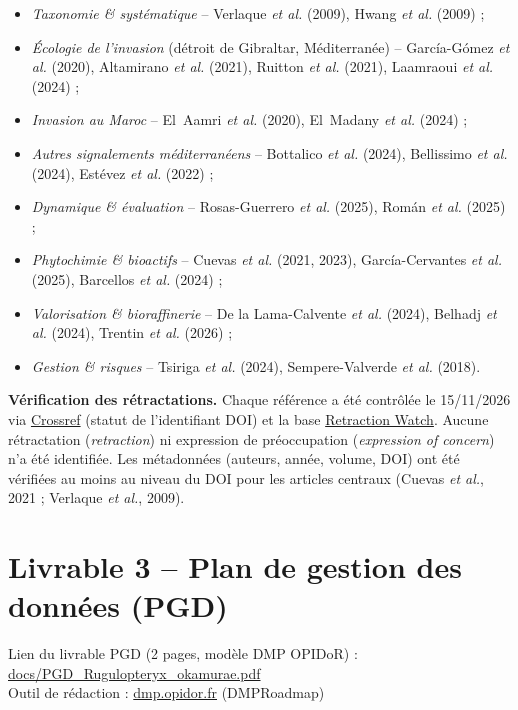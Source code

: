 \documentclass[11pt,a4paper]{article}
\begin{document}
\begin{itemize}
  \item \textit{Taxonomie \& systématique} -- Verlaque \textit{et al.} (2009), Hwang \textit{et al.} (2009) ;
  \item \textit{Écologie de l'invasion} (détroit de Gibraltar, Méditerranée) -- García-Gómez \textit{et al.} (2020), Altamirano \textit{et al.} (2021), Ruitton \textit{et al.} (2021), Laamraoui \textit{et al.} (2024) ;
  \item \textit{Invasion au Maroc} -- El~Aamri \textit{et al.} (2020), El~Madany \textit{et al.} (2024) ;
  \item \textit{Autres signalements méditerranéens} -- Bottalico \textit{et al.} (2024), Bellissimo \textit{et al.} (2024), Estévez \textit{et al.} (2022) ;
  \item \textit{Dynamique \& évaluation} -- Rosas-Guerrero \textit{et al.} (2025), Román \textit{et al.} (2025) ;
  \item \textit{Phytochimie \& bioactifs} -- Cuevas \textit{et al.} (2021, 2023), García-Cervantes \textit{et al.} (2025), Barcellos \textit{et al.} (2024) ;
  \item \textit{Valorisation \& bioraffinerie} -- De la Lama-Calvente \textit{et al.} (2024), Belhadj \textit{et al.} (2024), Trentin \textit{et al.} (2026) ;
  \item \textit{Gestion \& risques} -- Tsiriga \textit{et al.} (2024), Sempere-Valverde \textit{et al.} (2018).
\end{itemize}

\textbf{Vérification des rétractations.} Chaque référence a été contrôlée le
15/11/2026 via \href{https://www.crossref.org}{Crossref} (statut de l'identifiant DOI)
et la base \href{https://retractionwatch.com}{Retraction Watch}. Aucune rétractation
(\textit{retraction}) ni expression de préoccupation (\textit{expression of concern})
n'a été identifiée. Les métadonnées (auteurs, année, volume, DOI) ont été vérifiées
au moins au niveau du DOI pour les articles centraux (Cuevas \textit{et al.}, 2021 ;
Verlaque \textit{et al.}, 2009).

\section{Livrable 3 -- Plan de gestion des données (PGD)}
\begin{lienbox}{Lien du livrable}
PGD (2 pages, modèle DMP OPIDoR) :
\href{https://github.com/JihanElkhattabi/rugulopteryx-okamurae-these/blob/main/docs/PGD_Rugulopteryx_okamurae.pdf}{docs/PGD\_Rugulopteryx\_okamurae.pdf}\\
Outil de rédaction : \href{https://dmp.opidor.fr}{dmp.opidor.fr} (DMPRoadmap)
\end{lienbox}
\end{document}

